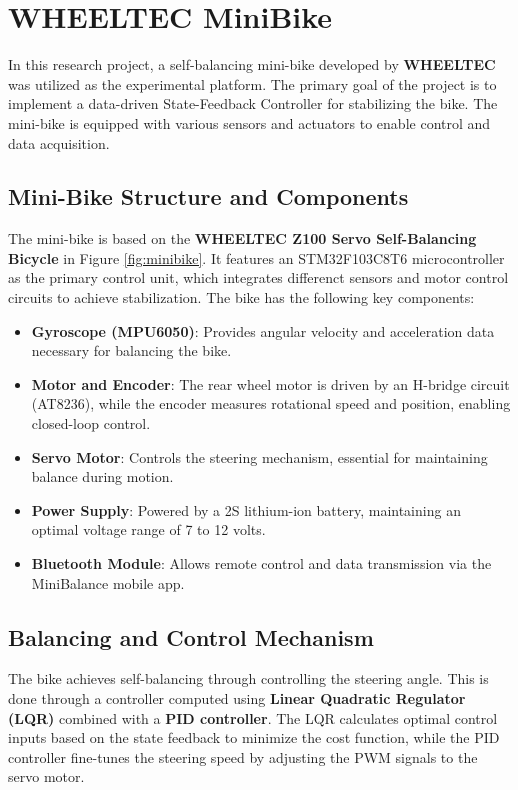 \section{WHEELTEC MiniBike}
In this research project, a self-balancing mini-bike developed by \textbf{WHEELTEC} was utilized as the experimental platform. The primary goal of the project is to implement a data-driven State-Feedback Controller for stabilizing the bike. The mini-bike is equipped with various sensors and actuators to enable control and data acquisition.

\subsection{Mini-Bike Structure and Components}
The mini-bike is based on the \textbf{WHEELTEC Z100 Servo Self-Balancing Bicycle} in Figure \ref{fig:minibike}. It features an STM32F103C8T6 microcontroller as the primary control unit, which integrates differenct sensors and motor control circuits to achieve stabilization. The bike has the following key components:
\begin{itemize}
	\item \textbf{Gyroscope (MPU6050)}: Provides angular velocity and acceleration data necessary for balancing the bike.
	\item \textbf{Motor and Encoder}: The rear wheel motor is driven by an H-bridge circuit (AT8236), while the encoder measures rotational speed and position, enabling closed-loop control.
	\item \textbf{Servo Motor}: Controls the steering mechanism, essential for maintaining balance during motion.
	\item \textbf{Power Supply}: Powered by a 2S lithium-ion battery, maintaining an optimal voltage range of 7 to 12 volts.
	\item \textbf{Bluetooth Module}: Allows remote control and data transmission via the MiniBalance mobile app.
\end{itemize}

\subsection{Balancing and Control Mechanism}
The bike achieves self-balancing through controlling the steering angle. This is done through a controller computed using \textbf{Linear Quadratic Regulator (LQR)} combined with a \textbf{PID controller}. The LQR calculates optimal control inputs based on the state feedback to minimize the cost function, while the PID controller fine-tunes the steering speed by adjusting the PWM signals to the servo motor.

